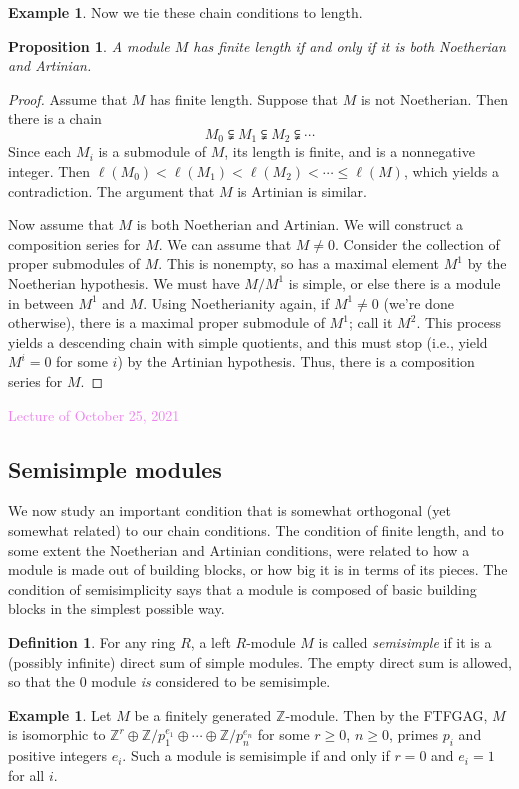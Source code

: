 \documentclass{amsart}[12pt]
\newcommand{\Oct}[1]{\textcolor{violet}{Lecture of October #1, 2021}}
\newcommand{\Z}{\mathbb{Z}}
\newcommand{\DEF}[1]{\emph{#1}\index{#1}}
\numberwithin{equation}{section}
\theoremstyle{plain} %
\newtheorem{prop}[equation]{Proposition}
\theoremstyle{definition}
\newtheorem{defn}[equation]{Definition}
\newtheorem{ex}[equation]{Example}
\theoremstyle{remark}
\newcommand{\ssec}[1]{\subsection{#1}}
\begin{document}
\begin{ex}
Now we tie these chain conditions to length.

\begin{prop} A module $M$ has finite length if and only if it is both Noetherian and Artinian.
\end{prop}
\begin{proof}
Assume that $M$ has finite length. Suppose that $M$ is not Noetherian. Then there is a chain 
\[ M_0 \subsetneqq M_1 \subsetneqq M_2 \subsetneqq  \cdots\]
Since each $M_i$ is a submodule of $M$, its length is finite, and is a nonnegative integer. Then $\ell(M_0) < \ell(M_1) < \ell(M_2) < \cdots \leq \ell(M)$, which yields a contradiction. The argument that $M$ is Artinian is similar.

Now assume that $M$ is both Noetherian and Artinian. We will construct a composition series for $M$. We can assume that $M\neq 0$. Consider the collection of proper submodules of $M$. This is nonempty, so has a maximal element $M^1$ by the Noetherian hypothesis. We must have $M/M^1$ is simple, or else there is a module in between $M^1$ and $M$. Using Noetherianity again, if $M^1\neq 0$ (we're done otherwise), there is a maximal proper submodule of $M^1$; call it $M^2$. This process yields a descending chain with simple quotients, and this must stop (i.e., yield $M^i=0$ for some $i$) by the Artinian hypothesis. Thus, there is a composition series for $M$.
\end{proof}

\newpage
\Oct{25}

\ssec{Semisimple modules}

We now study an important condition that is somewhat orthogonal (yet somewhat related) to our chain conditions. The condition of finite length, and to some extent the Noetherian and Artinian conditions, were related to how a module is made out of building blocks, or how big it is in terms of its pieces. The condition of semisimplicity says that a module is composed of basic building blocks in the simplest possible way.

\begin{defn} For any ring $R$, a left $R$-module $M$ is called \DEF{semisimple} if it is a (possibly infinite) direct sum of simple modules. The empty direct sum is allowed, so that the $0$ module {\em is} considered to be semisimple. %
\end{defn}


\begin{ex} Let $M$ be a finitely generated $\Z$-module. Then by the FTFGAG, $M$ is isomorphic to
  $\Z^r \oplus \Z/p_1^{e_1} \oplus \cdots \oplus \Z/p_n^{e_n}$ for some $r \geq 0$, $n \geq 0$, primes $p_i$ and positive integers $e_i$.
  Such a module is semisimple if and only if $r = 0$ and $e_i = 1$ for all $i$.
\end{ex}






\end{ex}
\end{document}
